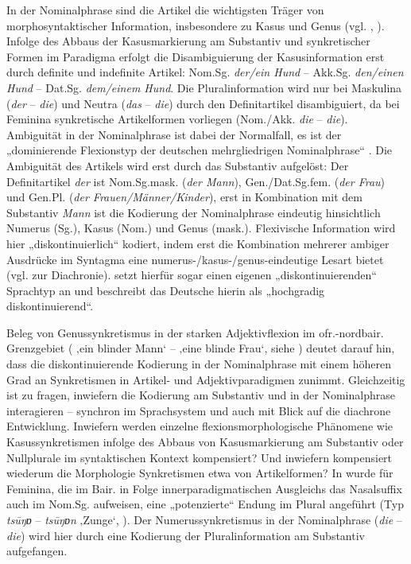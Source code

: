 In der Nominalphrase sind die Artikel die wichtigsten Träger von morphosyntaktischer Information, insbesondere zu Kasus und Genus (vgl. \citealt[123]{Szczepaniak2010}, \citealt[140]{Wiese2000}). Infolge des Abbaus der Kasusmarkierung am Substantiv und synkretischer Formen im Paradigma erfolgt die Disambiguierung der Kasusinformation erst durch definite und indefinite Artikel: Nom.Sg. \textit{der/ein Hund} -- Akk.Sg. \textit{den/einen Hund} -- Dat.Sg. \textit{dem/einem Hund}. Die Pluralinformation wird nur bei Maskulina (\textit{der} -- \textit{die}) und Neutra (\textit{das} -- \textit{die}) durch den Definitartikel disambiguiert, da bei Feminina synkretische Artikelformen vorliegen (Nom./Akk. \textit{die} -- \textit{die}). Ambiguität in der Nominalphrase ist dabei der Normalfall, es ist der „dominierende Flexionstyp der deutschen mehrgliedrigen Nominalphrase“ \citep[117]{Ronneberger-Sibold1994}. Die Ambiguität des Artikels wird erst durch das Substantiv aufgelöst: Der Definitartikel \textit{der} ist Nom.Sg.mask. (\textit{der Mann}), Gen./Dat.Sg.fem. (\textit{der Frau}) und Gen.Pl. (\textit{der Frauen/Männer/Kinder}), erst in Kombination mit dem Substantiv \textit{Mann} ist die Kodierung der Nominalphrase eindeutig hinsichtlich Numerus (Sg.), Kasus (Nom.) und Genus (mask.). Flexivische Information wird hier „diskontinuierlich“ kodiert, indem erst die Kombination mehrerer ambiger Ausdrücke im Syntagma eine numerus-/kasus-/genus-eindeutige Lesart bietet (vgl. \citealt{Szczepaniak2010} zur Diachronie). \citet[982]{Werner1979} setzt hierfür sogar einen eigenen „diskontinuierenden“ Sprachtyp an und beschreibt das Deutsche hierin als „hochgradig diskontinuierend“.

 Beleg von Genussynkretismus in der starken Adjektivflexion im ofr.-nordbair. Grenzgebiet (   ‚ein blinder Mann‘ --    ‚eine blinde Frau‘, siehe ) deutet darauf hin, dass die diskontinuierende Kodierung in der Nominalphrase mit einem höheren Grad an Synkretismen in Artikel- und Adjektivparadigmen zunimmt. Gleichzeitig ist zu fragen, inwiefern die Kodierung am Substantiv und in der Nominalphrase interagieren -- synchron im Sprachsystem und auch mit Blick auf die diachrone Entwicklung. Inwiefern werden einzelne flexionsmorphologische Phänomene wie Kasussynkretismen infolge des Abbaus von Kasusmarkierung am Substantiv oder Nullplurale im syntaktischen Kontext kompensiert? Und inwiefern kompensiert wiederum die Morphologie Synkretismen etwa von Artikelformen? In  wurde für Feminina, die im Bair. in Folge innerparadigmatischen Ausgleichs das Nasalsuffix auch im Nom.Sg. aufweisen, eine „potenzierte“ Endung im Plural angeführt (Typ \textit{tsūŋɒ} -- \textit{tsūŋɒn} ‚Zunge‘, \citealt[431]{Schirmunski1962}). Der Numerussynkretismus in der Nominalphrase (\textit{die} -- \textit{die}) wird hier durch eine Kodierung der Pluralinformation am Substantiv aufgefangen.

